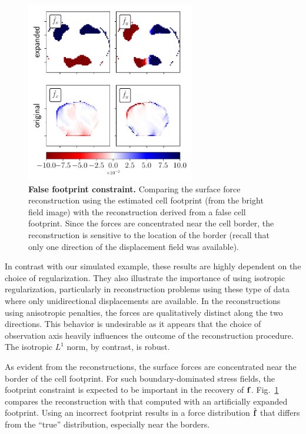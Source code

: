 \documentclass[aps,prl,reprint,groupedaddress,twocolumn]{revtex4-1}
\def\f{{\bf f}}
\begin{document}

\begin{figure}
\includegraphics[width=2.9in]{fig10}
\caption{\textbf{False footprint constraint.} Comparing the
  surface force reconstruction using the estimated cell footprint
  (from the bright field image) with the reconstruction derived from a
  false cell footprint. Since the forces are concentrated near the
  cell border, the reconstruction is sensitive to the location of the
  border (recall that only one direction of the displacement field was
  available).}
\label{DATA3}
\end{figure}

In contrast with our simulated example, these results are highly
dependent on the choice of regularization. They also illustrate the
importance of using isotropic regularization, particularly in
reconstruction problems using these type of data where only
unidirectional displacements are available.  In the reconstructions
using anisotropic penalties, the forces are qualitatively distinct
along the two directions. This behavior is undesirable as it appears
that the choice of observation axis heavily influences the outcome of
the reconstruction procedure. The isotropic $L^1$ norm, by contrast,
is robust.

As evident from the reconstructions, the surface forces are
concentrated near the border of the cell footprint. For such
boundary-dominated stress fields, the footprint constraint is expected
to be important in the recovery of $\f$. Fig.~\ref{DATA3} compares the
reconstruction with that computed with an artificially expanded
footprint. Using an incorrect footprint results in a force
distribution $\hat{\f}$ that differs from the ``true'' distribution,
especially near the borders. 
\end{document}
